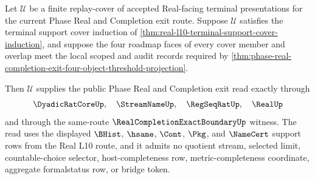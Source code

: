 \begin{theorem}
\label{thm:real-l10-route-cover-phase-exit-exactness}
Let $\mathcal{U}$ be a finite replay-cover of accepted Real-facing terminal
presentations for the current Phase Real and Completion exit route. Suppose
$\mathcal{U}$ satisfies the terminal support cover induction of
\autoref{thm:real-l10-terminal-support-cover-induction}, and suppose the four
roadmap faces of every cover member and overlap meet the local scoped and
audit records required by
\autoref{thm:phase-real-completion-exit-four-object-threshold-projection}.

Then $\mathcal{U}$ supplies the public Phase Real and Completion exit read
exactly through
$$
\DyadicRatCoreUp,\quad \StreamNameUp,\quad \RegSeqRatUp,\quad \RealUp
$$
and through the same-route $\RealCompletionExactBoundaryUp$ witness. The read
uses the displayed $\BHist$, $\hsame$, $\Cont$, $\Pkg$, and $\NameCert$
support rows from the Real L10 route, and it admits no quotient stream,
selected limit, countable-choice selector, host-completeness row,
metric-completeness coordinate, aggregate formalstatus row, or bridge token.
\end{theorem}

